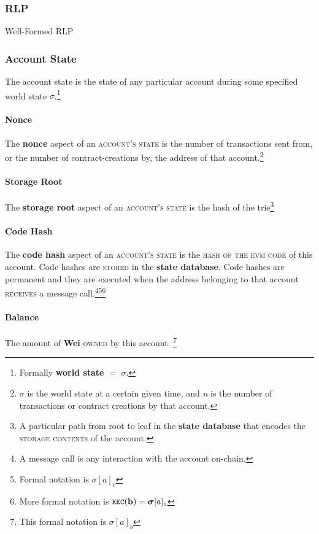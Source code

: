 \documentclass[10pt,a4paper,leqno,bibliography=totoc]{scrartcl}
\newenvironment{alphafootnotes}
{\par\edef\savedfootnotenumber{\number\value{footnote}}
\renewcommand{\thefootnote}{\alph{footnote}}
\setcounter{footnote}{0}}
{\par\setcounter{footnote}{\savedfootnotenumber}}
\begin{document}
\begin{alphafootnotes}
\begin{multicols*}{2}
			\subsubsection{RLP}
				Well-Formed RLP
	
			\subsubsection{Account State}
				The account state is the state of any particular account during some specified world state $\sigma$.\footnote{Formally \textbf{world state} $=$ $\sigma$.} \par

    				\paragraph{Nonce} 
					The \textbf{nonce} aspect of an \textsc{account's state} is the number of transactions sent from, or the number of contract-creations by, the address of that account.\footnote{$\sigma$ is the world state at a certain given time, and \textit{n} is the number of transactions or contract creations by that account.}
    				\paragraph{Storage Root}
    					The \textbf{storage root} aspect of an \textsc{account's state} is the hash of the trie\footnote{A particular path from root to leaf in the \textbf{\gls{state database}} that encodes the \textsc{storage contents} of the account.}
    				\paragraph{Code Hash}
    					The \textbf{code hash} aspect of an \textsc{account's state} is the \textsc{hash of the evm code} of this account. Code hashes are \textsc{stored} in the \textbf{\gls{state database}}. Code hashes are permanent and they are executed when the address belonging to that account \textsc{receives} a message call.\footnote{A message call is any interaction with the account on-chain.}\footnote{Formal notation is $\sigma[a]_c$}\footnote{More formal notation is $\texttt{\small KEC}(\mathbf{b}) = \boldsymbol{\sigma}[a]_c$}
    				\paragraph{Balance}
    					The amount of \textbf{Wei} \textsc{owned} by this account. \footnote{This formal notation is $\sigma[a]_b$}


\end{multicols*}
\end{alphafootnotes}
\end{document}
